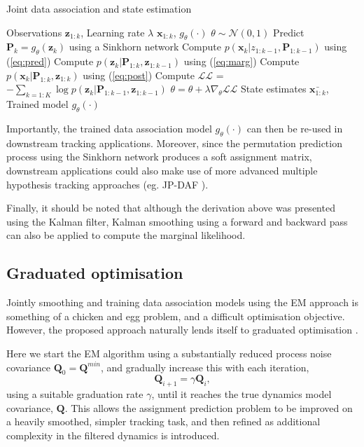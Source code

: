\documentclass[journal]{IEEEtran}
\begin{document}
\begin{algorithm}[H]
\caption{Joint data association and state estimation\label{alg}}
\begin{algorithmic}
\renewcommand{\algorithmicrequire}{\textbf{Input:}}
 \renewcommand{\algorithmicensure}{\textbf{Output:}}
 \REQUIRE Observations $\mathbf{z}_{1:k}$, Learning rate $\lambda$
 \ENSURE  $\mathbf{x}_{1:k}$, $g_\theta(\cdot)$
  \STATE $\theta \sim \mathcal{N}(0,1)$
  \STATE Predict $\mathbf{P}_{k} = g_\theta(\mathbf{z}_{k})$ using a Sinkhorn network
  \STATE Compute $p(\mathbf{x}_k|z_{1:k-1},\mathbf{P}_{1:k-1})$ using (\ref{eq:pred})
  \STATE Compute $p(\mathbf{z}_k|\mathbf{P}_{1:k},\mathbf{z}_{1:k-1})$ using (\ref{eq:marg})
   \STATE Compute $p(\mathbf{x}_k|\mathbf{P}_{1:k},\mathbf{z}_{1:k})$ using (\ref{eq:post})
  \ENDFOR
  \STATE Compute $\mathcal{LL}$ = $-\sum_{k=1:K} \log p(\mathbf{z}_{k}|\mathbf{P}_{1:k-1},\mathbf{z}_{1:k-1})$
  \STATE $\theta = \theta + \lambda\nabla_{\theta} \mathcal{LL}$
  \ENDFOR
 \RETURN State estimates $\bar{\mathbf{x}_{1:k}}$, Trained model $g_\theta(\cdot)$
\end{algorithmic}
\end{algorithm}

Importantly, the trained data association model $g_\theta(\cdot)$ can then be re-used in downstream tracking applications. Moreover, since the permutation prediction process using the Sinkhorn network produces a soft assignment matrix, downstream applications could also make use of more advanced multiple hypothesis tracking approaches (eg. JP-DAF \cite{bar1990tracking}).

Finally, it should be noted that although the derivation above was presented using the Kalman filter, Kalman smoothing \cite{rauch1965maximum} using a forward and backward pass can also be applied to compute the marginal likelihood.

\subsection{Graduated optimisation}

Jointly smoothing and training data association models using the EM approach is something of a chicken and egg problem, and a difficult optimisation objective. However, the proposed approach naturally lends itself to graduated optimisation \cite{thacker1996vision}. 

Here we start the EM algorithm using a substantially reduced process noise covariance $\mathbf{Q}_0 = \mathbf{Q}^{min}$, and gradually increase this with each iteration,
\begin{equation}
    \mathbf{Q}_{i+1} = \gamma \mathbf{Q}_{i},
\end{equation}
using a suitable graduation rate $\gamma$, until it reaches the true dynamics model covariance, $\mathbf{Q}$. This allows the assignment prediction problem to be improved on a heavily smoothed, simpler tracking task, and then refined as additional complexity in the filtered dynamics is introduced.
\end{document}

